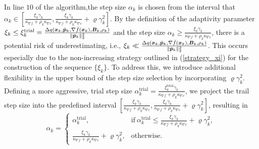 \documentclass[aos]{imsart}
\numberwithin{equation}{section}
\theoremstyle{plain}
\begin{document}
In line $10$ of the algorithm,the step size $\alpha_k$ is chosen from the interval that $\alpha_k \in  \left[ \frac{ \xi_{k}\gamma_k}{\kappa_{\nabla f} + \rho_k \kappa_{\nabla c}} , \frac{ \xi_{k}\gamma_k}{\kappa_{\nabla f} + \rho_k \kappa_{\nabla c}} + \varrho \gamma_k^2 \right]$. 
By the definition of the adaptivity parameter $\xi_k \leq \xi_{k}^{\text{trial}} =  \frac{\Delta q(\bm{x}_k,\Bar{\bm{p}}_k, \nabla \Bar{f}(\bm{x}_k),\bm{B}_k,\rho_k)}{\|\Bar{\bm{p}}_k\|_2^2}$ and the step size $\alpha_k \geq \frac{ \xi_{k}\gamma_k}{\kappa_{\nabla f} + \rho_k \kappa_{\nabla c}} $, there is a potential risk of underestimating, i.e., $\xi_k \ll  \frac{\Delta q(\bm{x}_k,\Bar{\bm{p}}_k, \nabla \Bar{f}(\bm{x}_k),\bm{B}_k,\rho_k)}{\|\Bar{\bm{p}}_k\|_2^2}$. This occurs especially due to the non-increasing strategy outlined in (\ref{strategy_xi}) for the construction of the sequence $\{\xi_k\}$. To address this, we introduce additional flexibility in the upper bound of the step size selection by incorporating $\varrho \gamma_k^2$. Defining a more aggressive, trial step size $\alpha_k^{\text{trial}} =  \frac{ \xi_{k}^{\text{trial}}\gamma_k}{\kappa_{\nabla f} + \rho_k \kappa_{\nabla c}} $, we project the trail step size into the predefined interval $\left[ \frac{ \xi_{k}\gamma_k}{\kappa_{\nabla f} + \rho_k \kappa_{\nabla c}}, \frac{ \xi_{k}\gamma_k}{\kappa_{\nabla f} + \rho_k \kappa_{\nabla c}} + \varrho \gamma_k^2 \right]$, resulting in 
\begin{equation}
    \alpha_k = \left\{ \begin{array}{cc}
       \alpha_k^{\text{trial}},  & \text{if}~\alpha_k^{\text{trial}} \leq \frac{ \xi_{k}\gamma_k}{\kappa_{\nabla f} + \rho_k \kappa_{\nabla c}} + \varrho \gamma_k^2, \\
       \frac{ \xi_{k}\gamma_k}{\kappa_{\nabla f} + \rho_k \kappa_{\nabla c}} + \varrho \gamma_k^2,  & \text{otherwise}. 
    \end{array} \right.
\end{equation}
\end{document}
